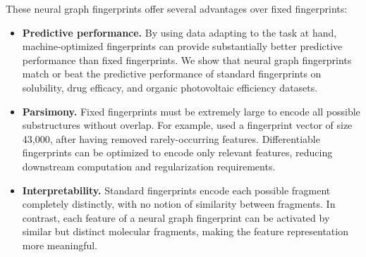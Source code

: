 \documentclass{article}
\begin{document}
These neural graph fingerprints offer several advantages over fixed fingerprints:
\begin{itemize}
\item {\bf Predictive performance.}
By using data adapting to the task at hand, machine-optimized fingerprints can provide substantially better predictive performance than fixed fingerprints.
We show that neural graph fingerprints match or beat the predictive performance of standard fingerprints on 
solubility, drug efficacy, and organic photovoltaic efficiency datasets.
\item {\bf Parsimony.}
Fixed fingerprints must be extremely large to encode all possible substructures without overlap.
For example, \cite{unterthinerdeep} used a fingerprint vector of size 43,000, after having removed rarely-occurring features.
Differentiable fingerprints can be optimized to encode only relevant features, reducing downstream computation and regularization requirements.
\item {\bf Interpretability.}
Standard fingerprints encode each possible fragment completely distinctly, with no notion of similarity between fragments.
In contrast, each feature of a neural graph fingerprint can be activated by similar but distinct molecular fragments, making the feature representation more meaningful.
\end{itemize}
\end{document}
